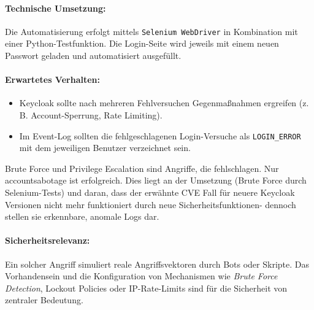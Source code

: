 \documentclass[a4paper,12pt]{article}
\begin{document}
	\paragraph{Technische Umsetzung:}
	Die Automatisierung erfolgt mittels \texttt{Selenium WebDriver} in Kombination mit einer Python-Testfunktion. Die Login-Seite wird jeweils mit einem neuen Passwort geladen und automatisiert ausgefüllt.
	
	\paragraph{Erwartetes Verhalten:}
	\begin{itemize}
		\item Keycloak sollte nach mehreren Fehlversuchen Gegenmaßnahmen ergreifen (z.\,B. Account-Sperrung, Rate Limiting).
		\item Im Event-Log sollten die fehlgeschlagenen Login-Versuche als \texttt{LOGIN\_ERROR} mit dem jeweiligen Benutzer verzeichnet sein.
	\end{itemize}
	Brute Force und Privilege Escalation sind Angriffe, die fehlschlagen. Nur \gls{accountsabotage} ist erfolgreich. Dies liegt an der Umsetzung (Brute Force durch Selenium-Tests) und daran, dass der erwähnte CVE Fall für neuere Keycloak Versionen nicht mehr funktioniert durch neue Sicherheitsfunktionen- dennoch stellen sie erkennbare, anomale Logs dar.
	
	\paragraph{Sicherheitsrelevanz:}
	Ein solcher Angriff simuliert reale Angriffsvektoren durch Bots oder Skripte. Das Vorhandensein und die Konfiguration von Mechanismen wie \textit{Brute Force Detection}, Lockout Policies oder IP-Rate-Limits sind für die Sicherheit von zentraler Bedeutung.
\end{document}
